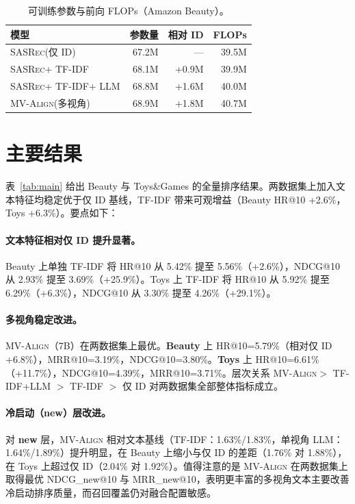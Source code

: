 \documentclass[sigconf,natbib=true,anonymous]{acmart}
\newcommand{\model}{\textsc{MV-Align}\xspace}
\newcommand{\base}{\textsc{SASRec}\xspace}
\newcommand{\tfidf}{\textsc{TF-IDF}\xspace}
\newcommand{\llm}{\textsc{LLM}\xspace}
\begin{document}
\begin{table}[h]
\caption{可训练参数与前向 FLOPs（Amazon Beauty）。}
\label{tab:params}
\centering
\small
\begin{tabular}{lrrr}
\toprule
\textbf{模型} & \textbf{参数量} & \textbf{相对 ID} & \textbf{FLOPs} \\
\midrule
\base (仅 ID) & 67.2M & --- & 39.5M \\
\base + \tfidf & 68.1M & +0.9M & 39.9M \\
\base + \tfidf + \llm & 68.8M & +1.6M & 40.0M \\
\model (多视角) & 68.9M & +1.8M & 40.7M \\
\bottomrule
\end{tabular}
\end{table}

\section{主要结果}\label{sec:main_results}
表~\ref{tab:main} 给出 Beauty 与 Toys\&Games 的全量排序结果。两数据集上加入文本特征均稳定优于仅 ID 基线，\tfidf 带来可观增益（Beauty HR@10 +2.6\%，Toys +6.3\%）。要点如下：

\paragraph{文本特征相对仅 ID 提升显著。}
Beauty 上单独 \tfidf 将 HR@10 从 5.42\% 提至 5.56\%（+2.6\%），NDCG@10 从 2.93\% 提至 3.69\%（+25.9\%）。Toys 上 \tfidf 将 HR@10 从 5.92\% 提至 6.29\%（+6.3\%），NDCG@10 从 3.30\% 提至 4.26\%（+29.1\%）。

\paragraph{多视角稳定改进。}
\model（7B）在两数据集上最优。\textbf{Beauty} 上 HR@10=5.79\%（相对仅 ID +6.8\%），MRR@10=3.19\%，NDCG@10=3.80\%。\textbf{Toys} 上 HR@10=6.61\%（+11.7\%），NDCG@10=4.39\%，MRR@10=3.71\%。层次关系 \model $>$ TF-IDF+LLM $>$ TF-IDF $>$ 仅 ID 对两数据集全部整体指标成立。

\paragraph{冷启动（new）层改进。}
对 \textbf{new} 层，\model 相对文本基线（\tfidf：1.63\%/1.83\%，单视角 \llm：1.64\%/1.89\%）提升明显，在 Beauty 上缩小与仅 ID 的差距（1.76\% 对 1.88\%），在 Toys 上超过仅 ID（2.04\% 对 1.92\%）。值得注意的是 \model 在两数据集上取得最优 NDCG\_new@10 与 MRR\_new@10，表明更丰富的多视角文本主要改善冷启动排序质量，而召回覆盖仍对融合配置敏感。
\end{document}
